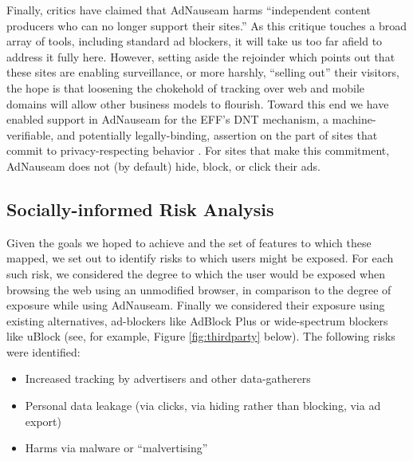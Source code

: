 \documentclass[conference]{IEEEtran}
\begin{document}
\indent Finally, critics have claimed that AdNauseam harms “independent content producers who can no longer support their sites.” As this critique touches a broad array of tools, including standard ad blockers, it will take us too far afield to address it fully here. However, setting aside the rejoinder which points out that these sites are enabling surveillance, or more harshly, “selling out” their visitors, the hope is that loosening the chokehold of tracking over web and mobile domains will allow other business models to flourish. Toward this end we have enabled support in AdNauseam for the EFF's DNT mechanism, a machine-verifiable, and potentially legally-binding, assertion on the part of sites that commit to privacy-respecting behavior \cite{EFF-1}. For sites that make this commitment, AdNauseam does not (by default) hide, block, or click their ads.

\subsection{Socially-informed Risk Analysis}

Given the goals we hoped to achieve and the set of features to which these mapped, we set out to identify risks to which users might be exposed. For each such risk, we considered the degree to which the user would be exposed when browsing the web using an unmodified browser, in comparison to the degree of exposure while using AdNauseam. Finally we considered their exposure using existing alternatives, ad-blockers like AdBlock Plus \cite{AdBlock} or wide-spectrum blockers like uBlock \cite{Gorhill}(see, for example, Figure \ref{fig:thirdparty} below). The following risks were identified:

\vspace{2mm}
\begin{itemize}
\item Increased tracking by advertisers and other data-gatherers
\item Personal data leakage (via clicks, via hiding rather than blocking, via ad export)
\item Harms via malware or “malvertising”
\end{itemize}
\vspace{1mm}
\end{document}
